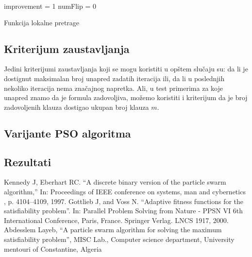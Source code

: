 \documentclass{article}
\begin{document}
\begin{algorithm}[H]
\SetAlgoLined
{}

\BlankLine
 improvement = 1\;
 numFlip = 0\;
 \caption{Funkcija lokalne pretrage}
\end{algorithm}


\subsection{Kriterijum zaustavljanja}
Jedini kriterijumi zaustavljanja koji se mogu koristiti u opštem slučaju su: da li je dostignut maksimalan broj unapred zadatih iteracija ili, da li u poslednjih nekoliko iteracija nema značajnog napretka.
Ali, u test primerima za koje unapred znamo da je formula zadovoljiva, možemo koristiti i kriterijum da je broj zadovoljenih klauza dostigao ukupan broj klauza $m$.

\subsection{Varijante PSO algoritma}

\subsection{Rezultati}



\newpage
\begin{thebibliography}{9}
Kennedy J, Eberhart RC. “A discrete binary version of the particle swarm algorithm,” In: Proceedings of IEEE conference on systems, man and cybernetics , p. 4104–4109, 1997.
 Gottlieb J, and Voss N. “Adaptive fitness functions for the satisfiability problem”. In: Parallel Problem Solving from Nature - PPSN VI 6th International Conference, Paris, France. Springer Verlag. LNCS 1917, 2000.
\bibitem{} Abdesslem Layeb, “A particle swarm algorithm for solving the maximum satisfiability problem”, MISC Lab., Computer science department, University mentouri of Constantine, Algeria
\end{thebibliography}
\end{document}
